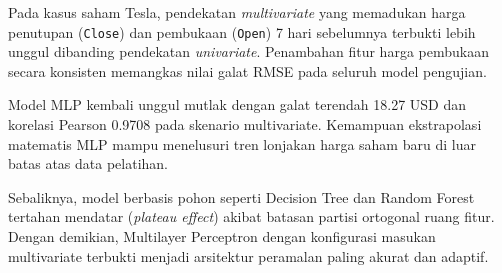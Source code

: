 \documentclass[a4paper,oneside,12pt]{report}
\begin{document}
Pada kasus saham Tesla, pendekatan \textit{multivariate} yang memadukan harga penutupan (\texttt{Close}) dan pembukaan (\texttt{Open}) 7 hari sebelumnya terbukti lebih unggul dibanding pendekatan \textit{univariate}. Penambahan fitur harga pembukaan secara konsisten memangkas nilai galat RMSE pada seluruh model pengujian.

Model MLP kembali unggul mutlak dengan galat terendah 18.27 USD dan korelasi Pearson 0.9708 pada skenario multivariate. Kemampuan ekstrapolasi matematis MLP mampu menelusuri tren lonjakan harga saham baru di luar batas atas data pelatihan.

Sebaliknya, model berbasis pohon seperti Decision Tree dan Random Forest tertahan mendatar (\textit{plateau effect}) akibat batasan partisi ortogonal ruang fitur. Dengan demikian, Multilayer Perceptron dengan konfigurasi masukan multivariate terbukti menjadi arsitektur peramalan paling akurat dan adaptif.

\clearpage
\end{document}
